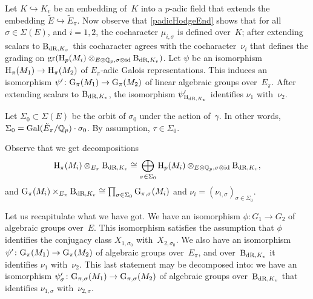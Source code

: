 \documentclass[10pt,twoside,leqno]{article}
\numberwithin{equation}{subsection}
\newcommand{\id}{\textnormal{id}}
\newcommand{\into}{\hookrightarrow}
\newcommand{\QQ}{\mathbb{Q}}
\newcommand{\QQp}{\QQ_{p}}
\newcommand{\Gal}{\textnormal{Gal}}
\newcommand{\BdR}[1]{\textnormal{B}_{\dR,#1}}
\newcommand{\gr}{\textnormal{gr}}
\newcommand{\dR}{\textnormal{dR}}
\newcommand{\HH}{\textnormal{H}}
\newcommand{\Hp}{\HH_{p}}
\newcommand{\GG}{\textnormal{G}}
\begin{document}
Let \(K \into K_{v}\) be an embedding of~\(K\) into a \(p\)-adic field
that extends the embedding \(\tilde{E} \into \tilde{E}_{\pi}\).
Now observe that \cref{padicHodgeEnd} shows that
for all \(\sigma \in \Sigma(E)\), and \(i = 1,2\),
the cocharacter \(\mu_{i,\sigma}\) is defined over~\(K\);
after extending scalars to \(\BdR{K_{v}}\)
this cocharacter agrees with the cocharacter~\(\nu_{i}\)
that defines the grading on
\(\gr(\Hp(M_{i}) \otimes_{E \otimes \QQp, \sigma \otimes \id} \BdR{K_{v}})\).
Let \(\psi\) be an isomorphism \(\HH_{\pi}(M_{1}) \to \HH_{\pi}(M_{2})\)
of \(E_{\pi}\)-adic Galois representations.
This induces an isomorphism
\(\psi' \colon \GG_{\pi}(M_{1}) \to \GG_{\pi}(M_{2})\)
of linear algebraic groups over~\(E_{\pi}\).
After extending scalars to \(\BdR{K_{v}}\),
the isomorphism \(\psi'_{\BdR{K_{v}}}\) identifies \(\nu_{1}\) with~\(\nu_{2}\).

Let \(\Sigma_{0} \subset \Sigma(E)\) be the orbit of \(\sigma_{0}\)
under the action of~\(\gamma\).
In other words, \(\Sigma_{0} = \Gal(\tilde{E}_{\pi}/\QQp) \cdot \sigma_{0}\).
By assumption, \(\tau \in \Sigma_{0}\).

Observe that we get decompositions
\[
 \HH_{\pi}(M_{i}) \otimes_{E_{\pi}} \BdR{K_{v}} \cong
 \bigoplus_{\sigma \in \Sigma_{0}}
 \Hp(M_{i}) \otimes_{E \otimes \QQp, \sigma \otimes \id} \BdR{K_{v}},
\]
and \(\GG_{\pi}(M_{i}) \times_{E_{\pi}} \BdR{K_{v}} \cong
 \prod_{\sigma \in \Sigma_{0}} \GG_{\pi,\sigma}(M_{i})\)
and \(\nu_{i} = (\nu_{i,\sigma})_{\sigma \in \Sigma_{0}}\).


Let us recapitulate what we have got.
We have an isomorphism \(\phi \colon G_{1} \to G_{2}\)
of algebraic groups over~\(E\).
This isomorphism satisfies the assumption that \(\phi\) identifies
the conjugacy class \(X_{1,\sigma_{0}}\) with~\(X_{2,\sigma_{0}}\).
We also have an isomorphism
\(\psi' \colon \GG_{\pi}(M_{1}) \to \GG_{\pi}(M_{2})\)
of algebraic groups over~\(E_{\pi}\),
and over~\(\BdR{K_{v}}\) it identifies \(\nu_{1}\) with~\(\nu_{2}\).
This last statement may be decomposed into:
we have an isomorphism
\(\psi'_{\sigma} \colon \GG_{\pi,\sigma}(M_{1}) \to \GG_{\pi,\sigma}(M_{2})\)
of algebraic groups over~\(\BdR{K_{v}}\)
that identifies \(\nu_{1,\sigma}\) with~\(\nu_{2,\sigma}\).
\end{document}
